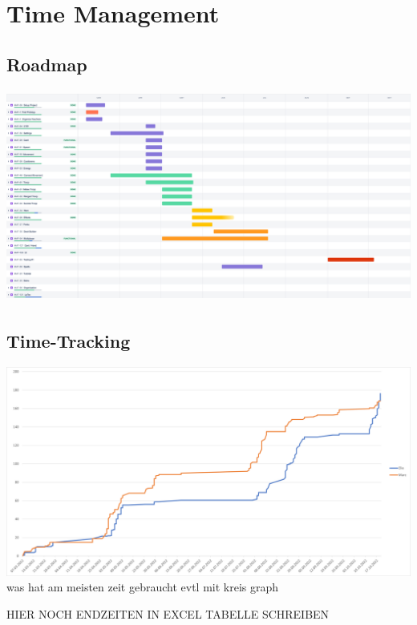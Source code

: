 \chapter{Time Management}

\section{Roadmap}
\includegraphics[height=7cm]{resources/Roadmap.png}\\

\section{Time-Tracking}
\includegraphics*[width=15cm]{resources/graph.png}\\

was hat am meisten zeit gebraucht evtl mit kreis graph

HIER NOCH ENDZEITEN IN EXCEL TABELLE SCHREIBEN




